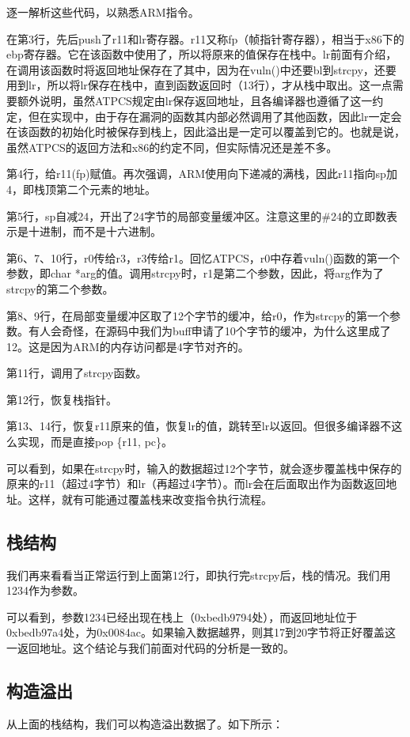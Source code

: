逐一解析这些代码，以熟悉ARM指令。

在第3行，先后push了r11和lr寄存器。r11又称fp（帧指针寄存器），相当于x86下的ebp寄存器。它在该函数中使用了，所以将原来的值保存在栈中。lr前面有介绍，在调用该函数时将返回地址保存在了其中，因为在vuln()中还要bl到strcpy，还要用到lr，所以将lr保存在栈中，直到函数返回时（13行），才从栈中取出。这一点需要额外说明，虽然ATPCS规定由lr保存返回地址，且各编译器也遵循了这一约定，但在实现中，由于存在漏洞的函数其内部必然调用了其他函数，因此lr一定会在该函数的初始化时被保存到栈上，因此溢出是一定可以覆盖到它的。也就是说，虽然ATPCS的返回方法和x86的约定不同，但实际情况还是差不多。

第4行，给r11(fp)赋值。再次强调，ARM使用向下递减的满栈，因此r11指向sp加4，即栈顶第二个元素的地址。

第5行，sp自减24，开出了24字节的局部变量缓冲区。注意这里的\#24的立即数表示是十进制，而不是十六进制。

第6、7、10行，r0传给r3，r3传给r1。回忆ATPCS，r0中存着vuln()函数的第一个参数，即char *arg的值。调用strcpy时，r1是第二个参数，因此，将arg作为了strcpy的第二个参数。

第8、9行，在局部变量缓冲区取了12个字节的缓冲，给r0，作为strcpy的第一个参数。有人会奇怪，在源码中我们为buff申请了10个字节的缓冲，为什么这里成了12。这是因为ARM的内存访问都是4字节对齐的。

第11行，调用了strcpy函数。

第12行，恢复栈指针。

第13、14行，恢复r11原来的值，恢复lr的值，跳转至lr以返回。但很多编译器不这么实现，而是直接pop \{r11, pc\}。

可以看到，如果在strcpy时，输入的数据超过12个字节，就会逐步覆盖栈中保存的原来的r11（超过4字节）和lr（再超过4字节）。而lr会在后面取出作为函数返回地址。这样，就有可能通过覆盖栈来改变指令执行流程。

\subsection{栈结构}
我们再来看看当正常运行到上面第12行，即执行完strcpy后，栈的情况。我们用1234作为参数。



可以看到，参数1234已经出现在栈上（0xbedb9794处），而返回地址位于0xbedb97a4处，为0x0084ac。如果输入数据越界，则其17到20字节将正好覆盖这一返回地址。这个结论与我们前面对代码的分析是一致的。

\subsection{构造溢出}
从上面的栈结构，我们可以构造溢出数据了。如下所示：

